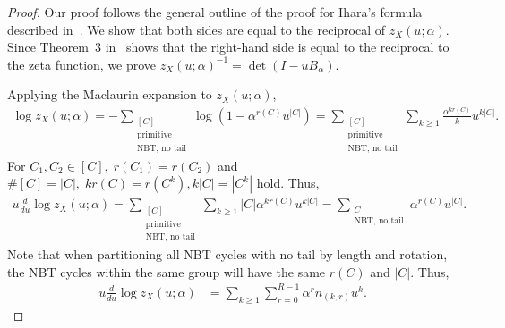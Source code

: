 \documentclass{article}
\theoremstyle{plain}
\begin{document}
\begin{proof}
	Our proof follows the general outline of the proof for Ihara's formula described in~\citep{Stark1996-mx}.
	We show that both sides are equal to the reciprocal of $z_{X}(u;\alpha)$.
	Since Theorem~3 in~\citep{Konno2019-jd} shows that the right-hand side is equal to the reciprocal to the zeta function,
	we prove $z_{X}(u; \alpha)^{-1} = \det (I - u B_{\alpha})$.

	Applying the Maclaurin expansion to $z_{X}(u;\alpha)$,
	\begin{align*}
		\log z_{X}(u; \alpha)
		= - \sum_{\substack{[C] \\\text{primitive}\\\text{NBT, no tail}}} \log \left( 1 - \alpha^{r(C)} u^{\left| C \right|} \right)
		= \sum_{\substack{[C]   \\\text{primitive}\\\text{NBT, no tail}}} \sum_{k\geq 1} \frac{\alpha^{k r(C)}}{k} u^{k \left| C \right|}
		.
	\end{align*}
	For $C_1, C_2 \in [C],\; r(C_1) = r(C_2)$ and $\#[C] = \left| C \right|,\; kr(C) = r(C^k), k\left| C \right| = |C^k|$ hold. Thus,
	\begin{align*}
		u \frac{d}{du} \log z_{X}(u; \alpha)
		= \sum_{\substack{[C] \\\text{primitive}\\\text{NBT, no tail}}} \sum_{k\geq 1} \left| C \right| \alpha^{k r(C)} u^{k \left| C \right|}
		= \sum_{\substack{C   \\\text{NBT, no tail}}} \alpha^{r(C)} u^{\left| C \right|}
		.
	\end{align*}
	Note that when partitioning all NBT cycles with no tail by length and rotation,
	the NBT cycles within the same group will have the same $r(C)$ and $|C|$. Thus,
	\begin{align}
		u \frac{d}{du} \log z_{X}(u; \alpha)
		 & = \sum_{k\geq 1} \sum_{r=0}^{R-1} \alpha^r n_{(k,r)} u^k
		.\label{eq1:corollary:ihara_formula}
	\end{align}


\end{proof}
\end{document}
